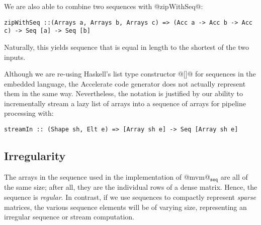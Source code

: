 We are also able to combine two sequences with @zipWithSeq@:
%
\begin{lstlisting}
zipWithSeq ::(Arrays a, Arrays b, Arrays c) => (Acc a -> Acc b -> Acc c) -> Seq [a] -> Seq [b]
\end{lstlisting}
%
Naturally, this yields sequence that is equal in length to the shortest of the two inputs.


Although we are re-using Haskell's list type constructor @[]@ for sequences in the embedded language, the Accelerate code generator does not actually represent them in the same way. Nevertheless, the notation is justified by our ability to incrementally stream a lazy list of arrays into a sequence of arrays for pipeline processing with:
%
\begin{lstlisting}
streamIn :: (Shape sh, Elt e) => [Array sh e] -> Seq [Array sh e]
\end{lstlisting}

\subsection{Irregularity}
\label{sec:irregularity}

The arrays in the sequence used in the implementation of @mvm@$_{\texttt{seq}}$ are all of the same size; after all, they are the individual rows of a dense matrix. Hence, the sequence is \emph{regular}. In contrast, if we use sequences to compactly represent \emph{sparse} matrices, the various sequence elements will be of varying size, representing an irregular sequence or stream computation.

